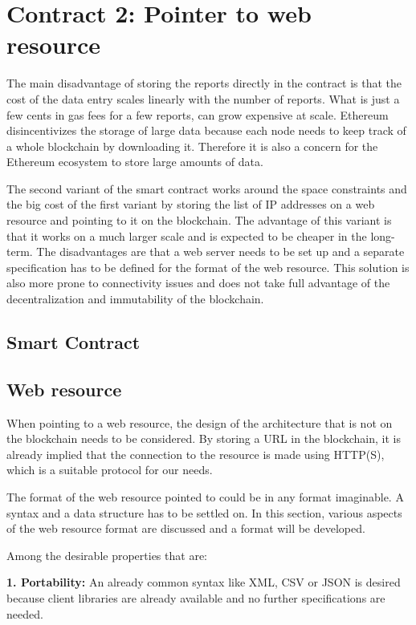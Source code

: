 \section{Contract 2: Pointer to web resource}
The main disadvantage of storing the reports directly in the contract is that the cost of the data entry scales linearly with the number of reports. What is just a few cents in gas fees for a few reports, can grow expensive at scale.
Ethereum disincentivizes the storage of large data because each node needs to keep track of a whole blockchain by downloading it. Therefore it is also a concern for the Ethereum ecosystem to store large amounts of data.

The second variant of the smart contract works around the space constraints and the big cost of the first variant by storing the list of IP addresses on a web resource and pointing to it on the blockchain. The advantage of this variant is that it works on a much larger scale and is expected to be cheaper in the long-term. The disadvantages are that a web server needs to be set up and a separate specification has to be defined for the format of the web resource. This solution is also more prone to connectivity issues and does not take full advantage of the decentralization and immutability of the blockchain.

\subsection{Smart Contract}

\subsection{Web resource}
When pointing to a web resource, the design of the architecture that is not on the blockchain needs to be considered. By storing a URL in the blockchain, it is already implied that the connection to the resource is made using HTTP(S), which is a suitable protocol for our needs.

The format of the web resource pointed to could be in any format imaginable. A syntax and a data structure has to be settled on. In this section, various aspects of the web resource format are discussed and a format will be developed.

Among the desirable properties that are:

\textbf{1. Portability:} An already common syntax like XML, CSV or JSON is desired because client libraries are already available and no further specifications are needed.

